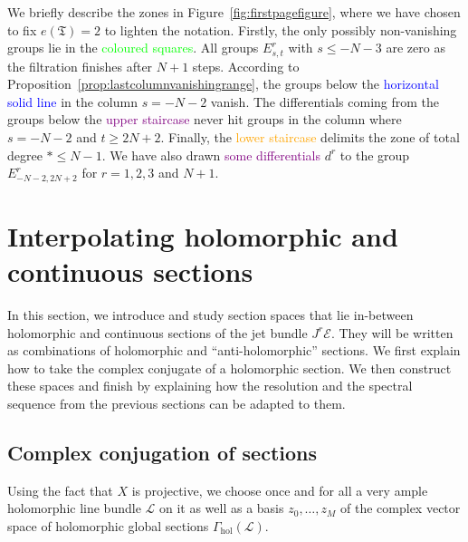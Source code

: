 \documentclass[a4paper]{amsart}
\newcommand{\cE}{\mathcal E}
\newcommand{\cL}{\mathcal L}
\newcommand{\fT}{\mathfrak T}
\theoremstyle{plain}
\theoremstyle{definition}
\newcommand{\Gammahol}{\Gamma_{\mathrm{hol}}}
\begin{document}
We briefly describe the zones in Figure~\ref{fig:firstpagefigure}, where we have chosen to fix $e(\fT) = 2$ to lighten the notation. Firstly, the only possibly non-vanishing groups lie in the \textcolor{lime}{coloured squares}. All groups $E^r_{s,t}$ with $s \leq -N-3$ are zero as the filtration finishes after $N+1$ steps. According to Proposition~\ref{prop:lastcolumnvanishingrange}, the groups below the \textcolor{blue}{horizontal solid line} in the column $s = -N-2$ vanish. The differentials coming from the groups below the \textcolor{purple}{upper staircase} never hit groups in the column where $s = -N-2$ and $t \geq 2N+2$. Finally, the \textcolor{orange}{lower staircase} delimits the zone of total degree $* \leq N-1$. We have also drawn \textcolor{purple}{some differentials} $d^r$ to the group $E^r_{-N-2,2N+2}$ for $r=1,2,3$ and $N+1$.

\section{Interpolating holomorphic and continuous sections}\label{section:interpolation}

In this section, we introduce and study section spaces that lie in-between holomorphic and continuous sections of the jet bundle $J^r\cE$. They will be written as combinations of holomorphic and ``anti-holomorphic'' sections. We first explain how to take the complex conjugate of a holomorphic section. We then construct these spaces and finish by explaining how the resolution and the spectral sequence from the previous sections can be adapted to them.

\subsection{Complex conjugation of sections}

Using the fact that $X$ is projective, we choose once and for all a very ample holomorphic line bundle $\cL$ on it as well as a basis $z_0, \ldots, z_M$ of the complex vector space of holomorphic global sections $\Gammahol(\cL)$.
\end{document}
